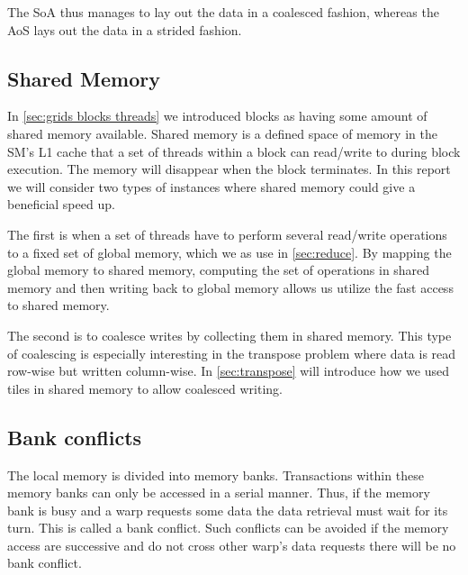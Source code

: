 The SoA thus manages to lay out the data in a coalesced fashion, whereas the AoS lays out the data in a strided fashion.

\subsection{Shared Memory}
\label{sec:shared memory}

In \cref{sec:grids blocks threads} we introduced blocks as having some amount of shared memory available.
Shared memory is a defined space of memory in the SM's L1 cache that a set of threads within a block can read/write to during block execution.
The memory will disappear when the block terminates.
In this report we will consider two types of instances where shared memory could give a beneficial speed up.

The first is when a set of threads have to perform several read/write operations to a fixed set of global memory, which we as use in \cref{sec:reduce}.
By mapping the global memory to shared memory, computing the set of operations in shared memory and then writing back to global memory allows us utilize the fast access to shared memory.

The second is to coalesce writes by collecting them in shared memory.
This type of coalescing is especially interesting in the transpose problem where data is read row-wise but written column-wise. 
In \cref{sec:transpose} will introduce how we used tiles in shared memory to allow coalesced writing.

\subsection{Bank conflicts}
\label{sec:bank conflicts}

The local memory is divided into memory banks.
Transactions within these memory banks can only be accessed in a serial manner.
Thus, if the memory bank is busy and a warp requests some data the data retrieval must wait for its turn.
This is called a bank conflict.
Such conflicts can be avoided if the memory access are successive and do not cross other warp's data requests there will be no bank conflict.~\cite{farber2011cuda}
